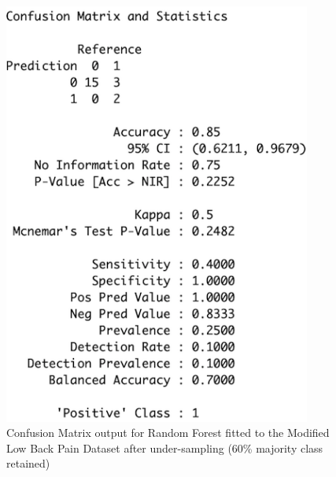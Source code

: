 \begin{figure}[!htbp]
\begin{minipage}{0.45\textwidth}
        \includegraphics[width=0.9\textwidth]{ThesisTemplate/appendix/images/Chapter5Appendix/ConfusionMatrix60/modLBP.png}
        \caption{Confusion Matrix output for Random Forest fitted to the Modified Low Back Pain Dataset after under-sampling (60\% majority class retained)}
        \label{fig:matrixmodLBP60}
    \end{minipage}
\end{figure}

